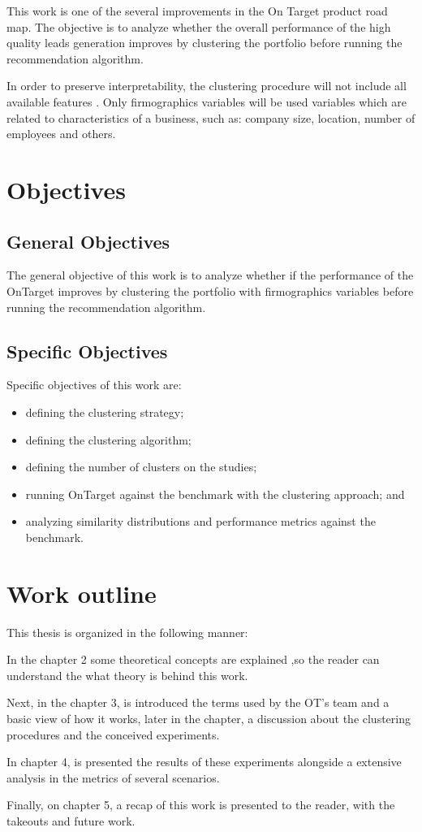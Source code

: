 This work is one of the several improvements in the On Target product road map. The objective is to analyze whether the overall performance of the high quality leads generation improves by clustering the portfolio before running the recommendation algorithm. 

In order to preserve interpretability, the clustering procedure will not include all available features . Only firmographics variables will be used\cite{wikipedia_firmographics} variables which are related to characteristics of a business, such as: company size, location, number of employees and others.


\section{Objectives}

\subsection{General Objectives}

The general objective of this work is to analyze whether if the performance of the OnTarget improves by clustering the portfolio with firmographics variables before running the recommendation algorithm.

\subsection{Specific Objectives}

Specific objectives of this work are:

\begin{itemize}
    \item defining the clustering strategy;
	\item defining the clustering algorithm;
    \item defining the number of clusters on the studies;
    \item running OnTarget against the benchmark with the clustering approach; and
    \item analyzing similarity distributions and performance metrics against the benchmark.
\end{itemize}


\section{Work outline}

This thesis is organized in the following manner: 

In the chapter 2 some theoretical concepts are explained ,so the reader can understand the what theory is behind this work. 

Next, in the chapter 3, is introduced the terms used by the OT's team and a basic view of how it works, later in the chapter, a discussion about the clustering procedures and the conceived experiments.

In chapter 4, is presented the results of these experiments alongside a extensive analysis in the metrics of several scenarios. 
 
Finally, on chapter 5, a recap of this work is presented to the reader, with the takeouts and future work. 